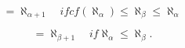$$= \aleph_{\alpha+1} \quad if cf(\aleph_{\alpha}) \leq \aleph_{\beta} \leq \aleph_{\alpha}$$

$$= \aleph_{\beta+1} \quad if \aleph_{\alpha} \leq \aleph_{\beta}.$$

